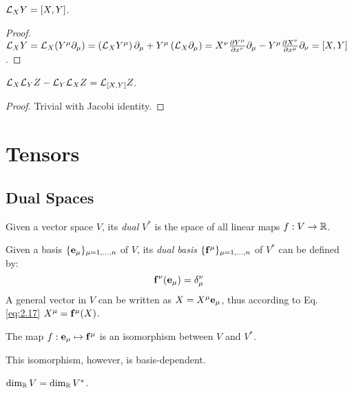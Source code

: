 \begin{proposition}
  $ \mathcal{L}_X Y = \left[ X,Y \right] $.
\end{proposition}
\begin{proof}
  $ \mathcal{L}_X Y = \mathcal{L}_X (Y^{\mu} \partial_{\mu}) = \left( \mathcal{L}_X Y^{\mu} \right) \partial_{\mu} + Y^{\mu} \left( \mathcal{L}_X \partial_{\mu} \right) = X^{\nu} \frac{\partial Y^{\mu}}{\partial x^{\nu}} \partial_{\mu} - Y^{\mu} \frac{\partial X^{\nu}}{\partial x^{\mu}} \partial_{\nu} = \left[ X,Y \right] $.
\end{proof}
\begin{proposition}
  $ \mathcal{L}_X \mathcal{L}_Y Z - \mathcal{L}_Y \mathcal{L}_X Z = \mathcal{L}_{\left[ X,Y \right]} Z $.
\end{proposition}
\begin{proof}
  Trivial with Jacobi identity.
\end{proof}

\section{Tensors}

\subsection{Dual Spaces}

\begin{definition}
  Given a vector space $ V $, its \textit{dual} $ V^* $ is the space of all linear maps $ f : V \rightarrow \mathbb{R} $.
\end{definition}

Given a basis $ \{\mathbf{e}_{\mu}\}_{\mu = 1,\dots,n} $ of $ V $, its \textit{dual basis} $ \{\mathbf{f}^{\mu}\}_{\mu=1,\dots,n} $ of $ V^* $ can be defined by:
\begin{equation}
  \mathbf{f}^{\nu}(\mathbf{e}_{\mu}) = \delta^{\nu}_{\mu}
  \label{eq:2.17}
\end{equation}
A general vector in $ V $ can be written as $ X = X^{\mu} \mathbf{e}_{\mu} $, thus according to Eq. \ref{eq:2.17} $ X^{\mu} = \mathbf{f}^{\mu}(X) $.

\begin{proposition}
  The map $ f : \mathbf{e}_{\mu} \mapsto \mathbf{f}^{\mu} $ is an isomorphism between $ V $ and $ V^* $.
\end{proposition}

This isomorphism, however, is basis-dependent.

\begin{proposition}
  $ \dim_{\mathbb{R}}V = \dim_{\mathbb{R}}V^* $.
\end{proposition}

